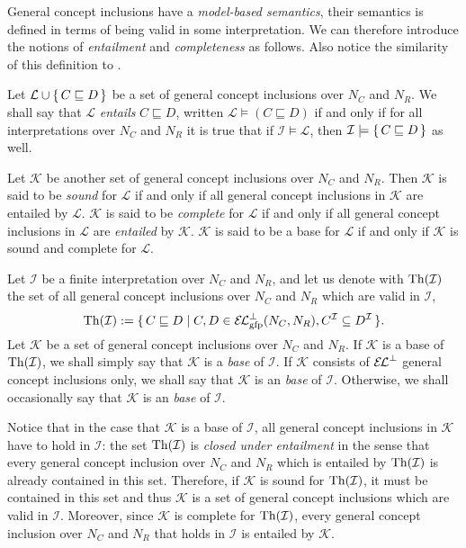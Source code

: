 General concept inclusions have a \emph{model-based semantics}, \ie their semantics is
defined in terms of being valid in some interpretation.  We can therefore introduce the
notions of \emph{entailment} and \emph{completeness} as follows.  Also notice the
similarity of this definition to .

\begin{Definition}
  \label{def:entailment-of-gcis}
  Let $\mathcal{L} \cup {\ensuremath{\{\, C \sqsubseteq D \,\}}}$ be a set of general concept inclusions
  over $N_C$ and $N_R$.  We shall say that $\mathcal{L}$ \emph{entails} $C \sqsubseteq D$,
  written $\mathcal{L} \models (C \sqsubseteq D)$ if and only if for all interpretations
  over $N_C$ and $N_R$ it is true that if $\mathcal{I} \models \mathcal{L}$, then
  $\mathcal{I} \models {\ensuremath{\{\, C \sqsubseteq D \,\}}}$ as well.

  Let $\mathcal{K}$ be another set of general concept inclusions over $N_C$ and $N_R$.
  Then $\mathcal{K}$ is said to be \emph{sound} for $\mathcal{L}$ if and only if all
  general concept inclusions in $\mathcal{K}$ are entailed by $\mathcal{L}$.
  $\mathcal{K}$ is said to be \emph{complete} for $\mathcal{L}$ if and only if all general
  concept inclusions in $\mathcal{L}$ are \emph{entailed} by $\mathcal{K}$.  $\mathcal{K}$
  is said to be a base for $\mathcal{L}$ if and only if $\mathcal{K}$ is sound and
  complete for $\mathcal{L}$.
\end{Definition}

Let $\mathcal{I}$ be a finite interpretation over $N_C$ and $N_R$, and let us denote with
$\operatorname{Th}(\mathcal{I})$ the set of all \ELgfpbot general concept inclusions over $N_C$ and
$N_R$ which are valid in $\mathcal{I}$, \ie
\begin{equation*}
  \Th(\mathcal{I}) := \set{ C \sqsubseteq D \mid C, D \in \ELgfpbot(N_{C}, N_{R}),
    C^{\mathcal{I}} \subseteq D^{\mathcal{I}} }.
\end{equation*}
Let $\mathcal{K}$ be a set of general concept inclusions over $N_C$ and $N_R$.  If
$\mathcal{K}$ is a base of $\operatorname{Th}(\mathcal{I})$, we shall simply say that $\mathcal{K}$ is a
\emph{base} of $\mathcal{I}$.  If $\mathcal{K}$ consists of ${{\mathcal{E}\kern-.3ex\mathcal{L}}^\bot}$ general concept
inclusions only, we shall say that $\mathcal{K}$ is an \emph{\ELbot base} of
$\mathcal{I}$.  Otherwise, we shall occasionally say that $\mathcal{K}$ is an
\emph{\ELgfpbot base} of $\mathcal{I}$.

Notice that in the case that $\mathcal{K}$ is a base of $\mathcal{I}$, all general concept
inclusions in $\mathcal{K}$ have to hold in $\mathcal{I}$: the set $\operatorname{Th}(\mathcal{I})$ is
\emph{closed under entailment} in the sense that every \ELgfpbot general concept inclusion
over $N_C$ and $N_R$ which is entailed by $\operatorname{Th}(\mathcal{I})$ is already contained in this
set.  Therefore, if $\mathcal{K}$ is sound for $\operatorname{Th}(\mathcal{I})$, it must be contained in
this set and thus $\mathcal{K}$ is a set of general concept inclusions which are valid in
$\mathcal{I}$.  Moreover, since $\mathcal{K}$ is complete for $\operatorname{Th}(\mathcal{I})$, every
\ELgfpbot general concept inclusion over $N_C$ and $N_R$ that holds in $\mathcal{I}$ is
entailed by $\mathcal{K}$.

